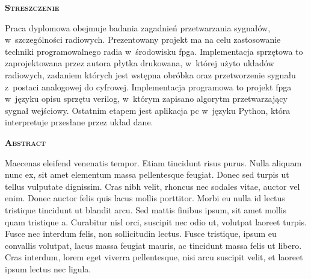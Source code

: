 \newpage
\thispagestyle{empty}

\vspace*{1.5cm}
{	
	\LARGE
	\textsc{\textbf{Streszczenie}}
}
\vspace*{0.5cm}

Praca dyplomowa obejmuje badania zagadnień przetwarzania sygnałów,
w~szczególności radiowych. Prezentowany projekt ma na celu zastosowanie
techniki programowalnego radia w~środowisku \gls{fpga}. Implementacja sprzętowa
to zaprojektowana przez autora płytka drukowana, w~której użyto układów
radiowych, zadaniem których jest wstępna obróbka oraz przetworzenie sygnału
z~postaci analogowej do cyfrowej. Implementacja programowa to projekt \gls{fpga}
w~języku opisu sprzętu \gls{verilog}, w~którym zapisano algorytm przetwarzający
sygnał wejściowy. Ostatnim etapem jest aplikacja \gls{pc} w~języku Python, która
interpretuje przesłane przez układ dane.

\vspace*{1.5cm}
{
	\LARGE
	\textsc{\textbf{Abstract}}
}
\vspace*{0.5cm}

Maecenas eleifend venenatis tempor. Etiam tincidunt risus purus. Nulla aliquam nunc ex, sit amet elementum massa pellentesque feugiat. Donec sed turpis ut tellus vulputate dignissim. Cras nibh velit, rhoncus nec sodales vitae, auctor vel enim. Donec auctor felis quis lacus mollis porttitor. Morbi eu nulla id lectus tristique tincidunt ut blandit arcu. Sed mattis finibus ipsum, sit amet mollis quam tristique a. Curabitur nisl orci, suscipit nec odio ut, volutpat laoreet turpis. Fusce nec interdum felis, non sollicitudin lectus. Fusce tristique, ipsum eu convallis volutpat, lacus massa feugiat mauris, ac tincidunt massa felis ut libero. Cras interdum, lorem eget viverra pellentesque, nisi arcu suscipit velit, et laoreet ipsum lectus nec ligula.

